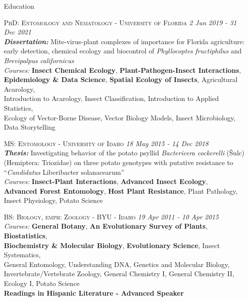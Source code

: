 \documentclass{resume} %
\begin{document}
\begin{rSection}{Education}
	
	\textsc{PhD: Entomology and Nematology - University of Florida} \hfill {\em 2 Jun 2019 - 31 Dec 2021}\\
	\textit{\textbf{Dissertation:}} Mite-virus-plant complexes of importance for Florida agriculture: early detection, chemical ecology and biocontrol of \textit{Phyllocoptes fructiphilus} and \textit{Brevipalpus californicus} \\
	\textit{{Courses:}} \textbf{Insect Chemical Ecology}, \textbf{Plant-Pathogen-Insect Interactions},\\
	\textbf{Epidemiology \& Data Science}, \textbf{Spatial Ecology of Insects}, Agricultural Acarology,\\
	Introduction to Acarology, Insect Classification, Introduction to Applied Statistics,\\
	Ecology of Vector-Borne Disease, Vector Biology Models, Insect Microbiology,\\ Data Storytelling\\ \hfill
	
	\textsc{MS: Entomology - University of Idaho} \hfill {\em 18 May 2015 - 14 Dec 2018}\\
	\textit{\textbf{Thesis:}} Investigating behavior of the potato psyllid \textit{Bactericera cockerelli} (Šulc)\\
	(Hemiptera: Triozidae) on three potato genotypes with putative resistance to\\ “\textit{Candidatus} Liberibacter solanacearum”\\
	\textit{{Courses:}} \textbf{Insect-Plant Interactions}, \textbf{Advanced Insect Ecology},\\
	\textbf{Advanced Forest Entomology}, \textbf{Host Plant Resistance}, Plant Pathology,\\
	Insect Physiology, Potato Science\\ \hfill
	
	\textsc{BS: Biology, emph: Zoology - BYU - Idaho} \hfill {\em 19 Apr 2011 - 10 Apr 2015}\\ \textit{{Courses:}} \textbf{General Botany}, \textbf{An Evolutionary Survey of Plants}, \textbf{Biostatistics},\\
	\textbf{Biochemistry \& Molecular Biology}, \textbf{Evolutionary Science}, Insect Systematics,\\
	General Entomology, Understanding DNA, Genetics and Molecular Biology, Invertebrate/Vertebrate Zoology, General Chemistry I, General Chemistry II, Ecology I, Potato Science\\
	\textbf{Readings in Hispanic Literature - Advanced Speaker}\\ \hfill
	
\end{rSection}
\end{document}
